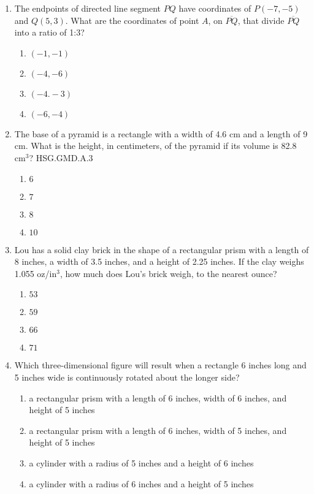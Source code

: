 \begin{enumerate}
\item The endpoints of directed line segment $PQ$ have coordinates of $P(-7,-5)$ and $Q(5,3)$. What are the coordinates of point $A$, on $\overline{PQ}$, that divide $\overline{PQ}$ into a ratio of 1:3?
\begin{multicols}{2}
  \begin{enumerate}
    \item $(-1,-1)$
    \item $(-4,-6)$
    \item $(-4.-3)$
    \item $(-6,-4)$
  \end{enumerate}
  \end{multicols} \vspace{2cm}

\item The base of a pyramid is a rectangle with a width of 4.6 cm and a length of 9 cm. What is the height, in centimeters, of the pyramid if its volume is 82.8 cm$^3$? \hfill HSG.GMD.A.3
\begin{multicols}{2}
  \begin{enumerate}
    \item $6$
    \item $7$
    \item $8$
    \item $10$
  \end{enumerate}
  \end{multicols} \vspace{0.5cm}

\item Lou has a solid clay brick in the shape of a rectangular prism with a length of 8 inches, a width of 3.5 inches, and a height of 2.25 inches. If the clay weighs 1.055 oz/in$^3$, how much does Lou's brick weigh, to the nearest ounce? 
\begin{multicols}{2}
  \begin{enumerate}
  \item $53$
  \item $59$
  \item $66$
  \item $71$
\end{enumerate}
\end{multicols} \vspace{2.5cm}

\newpage
\item Which three-dimensional figure will result when a rectangle 6 inches long and 5 inches wide is continuously rotated about the longer side?
\begin{enumerate}
  \item a rectangular prism with a length of 6 inches, width of 6 inches, and height of 5 inches
  \item a rectangular prism with a length of 6 inches, width of 5 inches, and height of 5 inches
  \item a cylinder with a radius of 5 inches and a height of 6 inches
  \item a cylinder with a radius of 6 inches and a height of 5 inches
\end{enumerate}


\end{enumerate}

